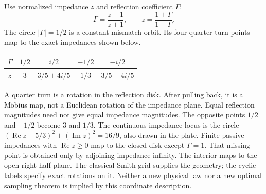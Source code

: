 Use normalized impedance $z$ and reflection coefficient $\Gamma$:
\[
\Gamma=\frac{z-1}{z+1},\qquad z=\frac{1+\Gamma}{1-\Gamma}.
\]
The circle $|\Gamma|=1/2$ is a constant-mismatch orbit. Its four quarter-turn points map to the exact impedances shown below.
\begin{center}
\begin{tabular}{c|cccc}
$\Gamma$ & $1/2$ & $i/2$ & $-1/2$ & $-i/2$\\\hline
$z$ & $3$ & $3/5+4i/5$ & $1/3$ & $3/5-4i/5$
\end{tabular}
\end{center}
A quarter turn is a rotation in the reflection disk. After pulling back, it is a M\"obius map, not a Euclidean rotation of the impedance plane. Equal reflection magnitudes need not give equal impedance magnitudes. The opposite points $1/2$ and $-1/2$ become $3$ and $1/3$. The continuous impedance locus is the circle $(\operatorname{Re}z-5/3)^2+(\operatorname{Im}z)^2=16/9$, also drawn in the plate.
Finite passive impedances with $\operatorname{Re}z\ge0$ map to the closed disk except $\Gamma=1$. That missing point is obtained only by adjoining impedance infinity. The interior maps to the open right half-plane.
The classical Smith grid supplies the geometry; the cyclic labels specify exact rotations on it. Neither a new physical law nor a new optimal sampling theorem is implied by this coordinate description.

